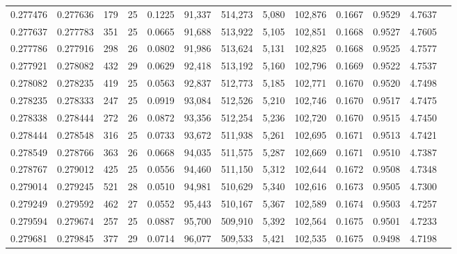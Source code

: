\begin{tabular}{rrrrrrrrrrrrr}
0.277476 & 0.277636 &   179 &  25 &                                     0.1225 &  91,337 & 514,273 &   5,080 & 102,876 & 0.1667 & 0.9529 & 4.7637 \\
0.277637 & 0.277783 &   351 &  25 &                                     0.0665 &  91,688 & 513,922 &   5,105 & 102,851 & 0.1668 & 0.9527 & 4.7605 \\
0.277786 & 0.277916 &   298 &  26 &                                     0.0802 &  91,986 & 513,624 &   5,131 & 102,825 & 0.1668 & 0.9525 & 4.7577 \\
0.277921 & 0.278082 &   432 &  29 &                                     0.0629 &  92,418 & 513,192 &   5,160 & 102,796 & 0.1669 & 0.9522 & 4.7537 \\
0.278082 & 0.278235 &   419 &  25 &                                     0.0563 &  92,837 & 512,773 &   5,185 & 102,771 & 0.1670 & 0.9520 & 4.7498 \\
0.278235 & 0.278333 &   247 &  25 &                                     0.0919 &  93,084 & 512,526 &   5,210 & 102,746 & 0.1670 & 0.9517 & 4.7475 \\
0.278338 & 0.278444 &   272 &  26 &                                     0.0872 &  93,356 & 512,254 &   5,236 & 102,720 & 0.1670 & 0.9515 & 4.7450 \\
0.278444 & 0.278548 &   316 &  25 &                                     0.0733 &  93,672 & 511,938 &   5,261 & 102,695 & 0.1671 & 0.9513 & 4.7421 \\
0.278549 & 0.278766 &   363 &  26 &                                     0.0668 &  94,035 & 511,575 &   5,287 & 102,669 & 0.1671 & 0.9510 & 4.7387 \\
0.278767 & 0.279012 &   425 &  25 &                                     0.0556 &  94,460 & 511,150 &   5,312 & 102,644 & 0.1672 & 0.9508 & 4.7348 \\
0.279014 & 0.279245 &   521 &  28 &                                     0.0510 &  94,981 & 510,629 &   5,340 & 102,616 & 0.1673 & 0.9505 & 4.7300 \\
0.279249 & 0.279592 &   462 &  27 &                                     0.0552 &  95,443 & 510,167 &   5,367 & 102,589 & 0.1674 & 0.9503 & 4.7257 \\
0.279594 & 0.279674 &   257 &  25 &                                     0.0887 &  95,700 & 509,910 &   5,392 & 102,564 & 0.1675 & 0.9501 & 4.7233 \\
0.279681 & 0.279845 &   377 &  29 &                                     0.0714 &  96,077 & 509,533 &   5,421 & 102,535 & 0.1675 & 0.9498 & 4.7198 \\

\end{tabular}
